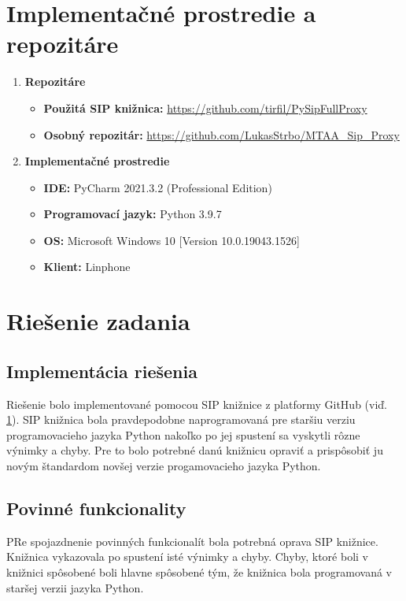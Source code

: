 \documentclass[10pt,oneside,slovak,a4paper]{article}
\begin{document}
\section{Implementačné prostredie a repozitáre}
\label{impl}
\begin{enumerate}
	\item \textbf{Repozitáre}
	\begin{itemize}
		\item \textbf{Použitá SIP knižnica:} \url{https://github.com/tirfil/PySipFullProxy}
		\item \textbf{Osobný repozitár:} \url{https://github.com/LukasStrbo/MTAA_Sip_Proxy}
	\end{itemize}
	\item \textbf{Implementačné prostredie}
	\begin{itemize}
		\item \textbf{IDE:} PyCharm 2021.3.2 (Professional Edition)
		\item \textbf{Programovací jazyk:} Python 3.9.7
		\item \textbf{OS:} Microsoft Windows 10 [Version 10.0.19043.1526]
		\item \textbf{Klient:} Linphone 
	\end{itemize}
\end{enumerate}

\section{Riešenie zadania}
\subsection{Implementácia riešenia}
Riešenie bolo implementované pomocou SIP knižnice z platformy GitHub (viď. \ref{impl}). SIP knižnica bola pravdepodobne naprogramovaná pre staršiu verziu programovacieho jazyka Python nakoľko po jej spustení sa vyskytli rôzne výnimky a chyby. Pre to bolo potrebné danú knižnicu opraviť a prispôsobiť ju novým štandardom novšej verzie progamovacieho jazyka Python.

\subsection{Povinné funkcionality}
PRe spojazdnenie povinných funkcionalít bola potrebná oprava SIP knižnice. Knižnica vykazovala po spustení isté výnimky a chyby. Chyby, ktoré boli v knižnici spôsobené boli hlavne spôsobené tým, že knižnica bola programovaná v staršej verzii jazyka Python.
\end{document}
